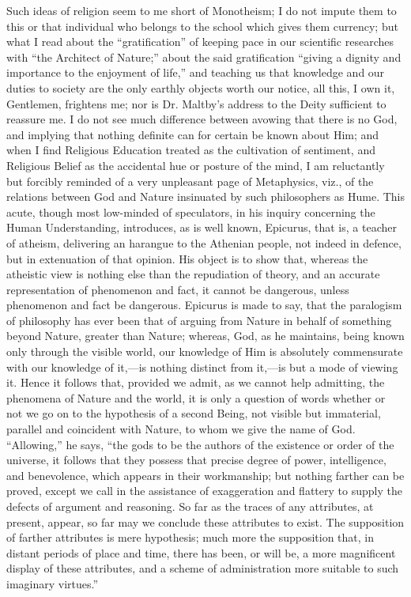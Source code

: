 Such ideas of religion seem to me short of Monotheism; I do not
impute them to this or that individual who belongs to the school which
gives them currency; but what I read about the
``gratification'' of keeping pace in our scientific researches
with ``the Architect of Nature;'' about the said gratification
``giving a dignity and importance to the enjoyment of life,''
and teaching us that knowledge and our duties to society are the
only earthly objects worth our notice, all this, I own it, Gentlemen,
frightens me; nor is Dr. Maltby's address to the Deity sufficient to
reassure me. I do not see much difference between avowing that there
is no God, and implying that nothing definite can for certain be known
about Him; and when I find Religious Education treated as the
cultivation of sentiment, and Religious Belief as the accidental hue
or posture of the mind, I am reluctantly but forcibly reminded of a
very unpleasant page of Metaphysics, viz., of the relations between
God and Nature insinuated by such philosophers as Hume. This acute,
though most low-minded of speculators, in his inquiry concerning the
Human Understanding, introduces, as is well known, Epicurus, that is,
a teacher of atheism, delivering an harangue to the Athenian people,
not indeed in defence, but in extenuation of that opinion. His object
is to show that, whereas the atheistic view is nothing else than the
repudiation of theory, and an accurate representation of phenomenon
and fact, it cannot be dangerous, unless phenomenon and fact be
dangerous. Epicurus is made to say, that the paralogism of philosophy
has ever been that of arguing from Nature in behalf of something
beyond Nature, greater than Nature; whereas, God, as he maintains,
being known only through the visible world, our knowledge of Him is
absolutely commensurate with our knowledge of it,—is nothing
distinct from it,—is but a mode of viewing it. Hence it follows
that, provided we admit, as we cannot help admitting, the phenomena of
Nature and the world, it is only a question of words whether or not we
go on to the hypothesis of a second Being, not visible but immaterial,
parallel and coincident with Nature, to whom we give the name of God.
``Allowing,'' he says, ``the gods to be the authors
of the existence or order of the universe, it follows that they
possess that precise degree of power, intelligence, and benevolence,
which appears in their workmanship; but nothing farther can be proved,
except we call in the assistance of exaggeration and flattery to
supply the defects of argument and reasoning. So far as the traces of
any attributes, at present, appear, so far may we conclude these
attributes to exist. The supposition of farther attributes is mere
hypothesis; much more the supposition that, in distant periods of
place and time, there has been, or will be, a more magnificent display
of these attributes, and a scheme of administration more suitable to
such imaginary virtues.''

